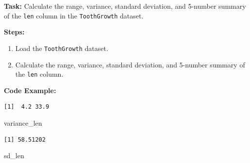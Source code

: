 \documentclass[
  letterpaper,
  DIV=11,
  numbers=noendperiod]{scrreprt}
\newenvironment{Shaded}{\begin{snugshade}}{\end{snugshade}}
\newcommand{\CommentTok}[1]{\textcolor[rgb]{0.37,0.37,0.37}{#1}}
\newcommand{\FunctionTok}[1]{\textcolor[rgb]{0.28,0.35,0.67}{#1}}
\newcommand{\NormalTok}[1]{\textcolor[rgb]{0.00,0.23,0.31}{#1}}
\newcommand{\OtherTok}[1]{\textcolor[rgb]{0.00,0.23,0.31}{#1}}
\newcommand{\SpecialCharTok}[1]{\textcolor[rgb]{0.37,0.37,0.37}{#1}}
\providecommand{\tightlist}{%
  \setlength{\itemsep}{0pt}\setlength{\parskip}{0pt}}\usepackage{longtable,booktabs,array}
\begin{document}
\textbf{Task:} Calculate the range, variance, standard deviation, and
5-number summary of the \texttt{len} column in the \texttt{ToothGrowth}
dataset.

\textbf{Steps:}

\begin{enumerate}
\def\labelenumi{\arabic{enumi}.}
\tightlist
\item
  Load the \texttt{ToothGrowth} dataset.
\item
  Calculate the range, variance, standard deviation, and 5-number
  summary of the \texttt{len} column.
\end{enumerate}

\textbf{Code Example:}

\begin{Shaded}
\end{Shaded}

\begin{verbatim}
[1]  4.2 33.9
\end{verbatim}

\begin{Shaded}
\begin{Highlighting}[]
\NormalTok{variance\_len}
\end{Highlighting}
\end{Shaded}

\begin{verbatim}
[1] 58.51202
\end{verbatim}

\begin{Shaded}
\begin{Highlighting}[]
\NormalTok{sd\_len}
\end{Highlighting}
\end{Shaded}
\end{document}
